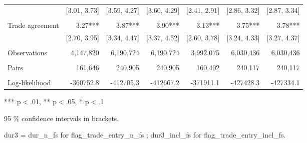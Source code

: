 \begin{table}[!h]
\begin{tabular}{lllllll}
\multicolumn{1}{l}{} &
  \multicolumn{1}{|r}{[3.01,    3.73]} &
  \multicolumn{1}{r}{[3.59,    4.27]} &
  \multicolumn{1}{r}{[3.60,    4.29]} &
  \multicolumn{1}{r}{[2.41,    2.91]} &
  \multicolumn{1}{r}{[2.86,    3.32]} &
  \multicolumn{1}{r}{[2.87,    3.34]} \\
\multicolumn{1}{l}{} &
  \multicolumn{1}{|r}{} &
  \multicolumn{1}{r}{} &
  \multicolumn{1}{r}{} &
  \multicolumn{1}{r}{} &
  \multicolumn{1}{r}{} &
  \multicolumn{1}{r}{} \\
\multicolumn{1}{l}{Trade agreement} &
  \multicolumn{1}{|r}{3.27***} &
  \multicolumn{1}{r}{3.87***} &
  \multicolumn{1}{r}{3.90***} &
  \multicolumn{1}{r}{3.13***} &
  \multicolumn{1}{r}{3.75***} &
  \multicolumn{1}{r}{3.78***} \\
\multicolumn{1}{l}{} &
  \multicolumn{1}{|r}{[2.70,    3.95]} &
  \multicolumn{1}{r}{[3.34,    4.47]} &
  \multicolumn{1}{r}{[3.37,    4.52]} &
  \multicolumn{1}{r}{[2.60,    3.78]} &
  \multicolumn{1}{r}{[3.24,    4.33]} &
  \multicolumn{1}{r}{[3.27,    4.37]} \\
\multicolumn{1}{l}{} &
  \multicolumn{1}{|r}{} &
  \multicolumn{1}{r}{} &
  \multicolumn{1}{r}{} &
  \multicolumn{1}{r}{} &
  \multicolumn{1}{r}{} &
  \multicolumn{1}{r}{} \\
\multicolumn{1}{l}{Observations} &
  \multicolumn{1}{|r}{4,147,820} &
  \multicolumn{1}{r}{6,190,724} &
  \multicolumn{1}{r}{6,190,724} &
  \multicolumn{1}{r}{3,992,075} &
  \multicolumn{1}{r}{6,030,436} &
  \multicolumn{1}{r}{6,030,436} \\
\multicolumn{1}{l}{} &
  \multicolumn{1}{|r}{} &
  \multicolumn{1}{r}{} &
  \multicolumn{1}{r}{} &
  \multicolumn{1}{r}{} &
  \multicolumn{1}{r}{} &
  \multicolumn{1}{r}{} \\
\multicolumn{1}{l}{Pairs} &
  \multicolumn{1}{|r}{161,646} &
  \multicolumn{1}{r}{240,905} &
  \multicolumn{1}{r}{240,905} &
  \multicolumn{1}{r}{160,402} &
  \multicolumn{1}{r}{240,117} &
  \multicolumn{1}{r}{240,117} \\
\multicolumn{1}{l}{} &
  \multicolumn{1}{|r}{} &
  \multicolumn{1}{r}{} &
  \multicolumn{1}{r}{} &
  \multicolumn{1}{r}{} &
  \multicolumn{1}{r}{} &
  \multicolumn{1}{r}{} \\
\multicolumn{1}{l}{Log-likelihood} &
  \multicolumn{1}{|r}{-360752.8} &
  \multicolumn{1}{r}{-412705.3} &
  \multicolumn{1}{r}{-412667.2} &
  \multicolumn{1}{r}{-371911.1} &
  \multicolumn{1}{r}{-427428.3} &
  \multicolumn{1}{r}{-427334.1} \\
\cline{1-7}
\end{tabular}

\footnotesize{
*** p$<$.01, ** p$<$.05, * p$<$.1

95 \% confidence intervals in brackets.

dur3 = dur\_n\_fs for flag\_trade\_entry\_n\_fs ; dur3\_incl\_fs for flag\_trade\_entry\_incl\_fs.
}
\end{table}
